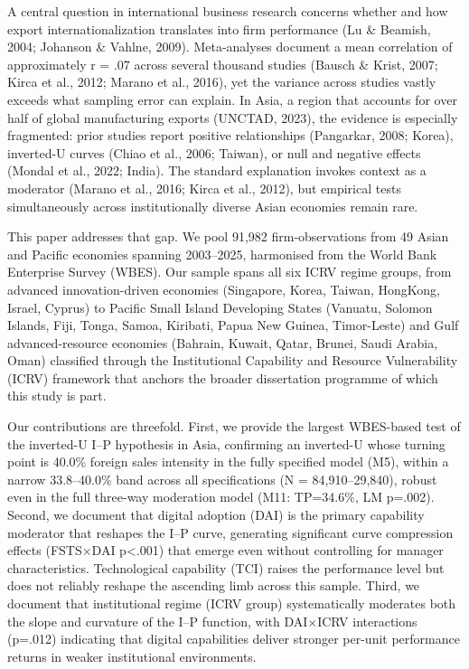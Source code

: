 \documentclass[
  12pt]{article}
\begin{document}
A central question in international business research concerns whether
and how export internationalization translates into firm performance (Lu
\& Beamish, 2004; Johanson \& Vahlne, 2009). Meta-analyses document a
mean correlation of approximately r = .07 across several thousand
studies (Bausch \& Krist, 2007; Kirca et al., 2012; Marano et al.,
2016), yet the variance across studies vastly exceeds what sampling
error can explain. In Asia, a region that accounts for over half of
global manufacturing exports (UNCTAD, 2023), the evidence is especially
fragmented: prior studies report positive relationships (Pangarkar,
2008; Korea), inverted-U curves (Chiao et al., 2006; Taiwan), or null
and negative effects (Mondal et al., 2022; India). The standard
explanation invokes context as a moderator (Marano et al., 2016; Kirca
et al., 2012), but empirical tests simultaneously across institutionally
diverse Asian economies remain rare.

This paper addresses that gap. We pool 91,982 firm-observations from 49
Asian and Pacific economies spanning 2003--2025, harmonised from the
World Bank Enterprise Survey (WBES). Our sample spans all six ICRV
regime groups, from advanced innovation-driven economies (Singapore,
Korea, Taiwan, HongKong, Israel, Cyprus) to Pacific Small Island
Developing States (Vanuatu, Solomon Islands, Fiji, Tonga, Samoa,
Kiribati, Papua New Guinea, Timor-Leste) and Gulf advanced-resource
economies (Bahrain, Kuwait, Qatar, Brunei, Saudi Arabia, Oman)
classified through the Institutional Capability and Resource
Vulnerability (ICRV) framework that anchors the broader dissertation
programme of which this study is part.

Our contributions are threefold. First, we provide the largest
WBES-based test of the inverted-U I--P hypothesis in Asia, confirming an
inverted-U whose turning point is 40.0\% foreign sales intensity in the
fully specified model (M5), within a narrow 33.8--40.0\% band across all
specifications (N = 84,910--29,840), robust even in the full three-way
moderation model (M11: TP=34.6\%, LM p=.002). Second, we document that
digital adoption (DAI) is the primary capability moderator that reshapes
the I--P curve, generating significant curve compression effects
(FSTS×DAI p\textless.001) that emerge even without controlling for
manager characteristics. Technological capability (TCI) raises the
performance level but does not reliably reshape the ascending limb
across this sample. Third, we document that institutional regime (ICRV
group) systematically moderates both the slope and curvature of the I--P
function, with DAI×ICRV interactions (p=.012) indicating that digital
capabilities deliver stronger per-unit performance returns in weaker
institutional environments.
\end{document}
